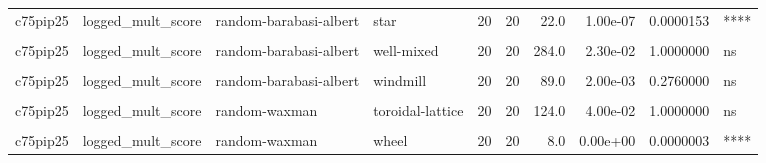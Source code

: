 \documentclass[
]{book}
\begin{document}
\begin{table}
\begin{tabular}{l|l|l|l|r|r|r|r|r|l}
\hline
\cellcolor{gray!6}{c75pip25} & \cellcolor{gray!6}{logged\_mult\_score} & \cellcolor{gray!6}{random-barabasi-albert} & \cellcolor{gray!6}{random-waxman} & \cellcolor{gray!6}{20} & \cellcolor{gray!6}{20} & \cellcolor{gray!6}{16.0} & \cellcolor{gray!6}{0.00e+00} & \cellcolor{gray!6}{0.0000034} & \cellcolor{gray!6}{****}\\
\hline
c75pip25 & logged\_mult\_score & random-barabasi-albert & star & 20 & 20 & 22.0 & 1.00e-07 & 0.0000153 & ****\\
\hline
\cellcolor{gray!6}{c75pip25} & \cellcolor{gray!6}{logged\_mult\_score} & \cellcolor{gray!6}{random-barabasi-albert} & \cellcolor{gray!6}{toroidal-lattice} & \cellcolor{gray!6}{20} & \cellcolor{gray!6}{20} & \cellcolor{gray!6}{15.0} & \cellcolor{gray!6}{0.00e+00} & \cellcolor{gray!6}{0.0000025} & \cellcolor{gray!6}{****}\\
\hline
c75pip25 & logged\_mult\_score & random-barabasi-albert & well-mixed & 20 & 20 & 284.0 & 2.30e-02 & 1.0000000 & ns\\
\hline
\cellcolor{gray!6}{c75pip25} & \cellcolor{gray!6}{logged\_mult\_score} & \cellcolor{gray!6}{random-barabasi-albert} & \cellcolor{gray!6}{wheel} & \cellcolor{gray!6}{20} & \cellcolor{gray!6}{20} & \cellcolor{gray!6}{0.0} & \cellcolor{gray!6}{0.00e+00} & \cellcolor{gray!6}{0.0000000} & \cellcolor{gray!6}{****}\\
\hline
c75pip25 & logged\_mult\_score & random-barabasi-albert & windmill & 20 & 20 & 89.0 & 2.00e-03 & 0.2760000 & ns\\
\hline
\cellcolor{gray!6}{c75pip25} & \cellcolor{gray!6}{logged\_mult\_score} & \cellcolor{gray!6}{random-waxman} & \cellcolor{gray!6}{star} & \cellcolor{gray!6}{20} & \cellcolor{gray!6}{20} & \cellcolor{gray!6}{116.0} & \cellcolor{gray!6}{2.30e-02} & \cellcolor{gray!6}{1.0000000} & \cellcolor{gray!6}{ns}\\
\hline
c75pip25 & logged\_mult\_score & random-waxman & toroidal-lattice & 20 & 20 & 124.0 & 4.00e-02 & 1.0000000 & ns\\
\hline
\cellcolor{gray!6}{c75pip25} & \cellcolor{gray!6}{logged\_mult\_score} & \cellcolor{gray!6}{random-waxman} & \cellcolor{gray!6}{well-mixed} & \cellcolor{gray!6}{20} & \cellcolor{gray!6}{20} & \cellcolor{gray!6}{390.0} & \cellcolor{gray!6}{0.00e+00} & \cellcolor{gray!6}{0.0000005} & \cellcolor{gray!6}{****}\\
\hline
c75pip25 & logged\_mult\_score & random-waxman & wheel & 20 & 20 & 8.0 & 0.00e+00 & 0.0000003 & ****\\
\hline

\end{tabular}
\end{table}
\end{document}
